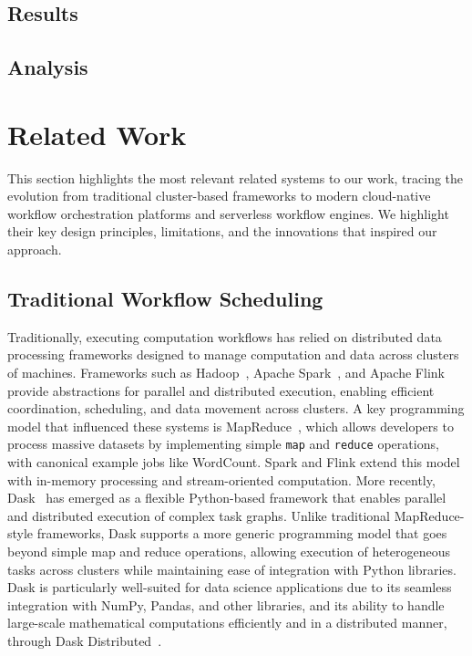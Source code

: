 \documentclass[conference]{IEEEtran}
\begin{document}
\subsection{Results}
\subsection{Analysis}



\section{Related Work}
\label{s:related_work}

This section highlights the most relevant related systems to our work, tracing the evolution from traditional cluster-based frameworks to modern cloud-native workflow orchestration platforms and serverless workflow engines. We highlight their key design principles, limitations, and the innovations that inspired our approach.

\subsection{Traditional Workflow Scheduling}
Traditionally, executing computation workflows has relied on distributed data processing frameworks designed to manage computation and data across clusters of machines. Frameworks such as Hadoop~\cite{apache_hadoop}, Apache Spark~\cite{apache_spark}, and Apache Flink~\cite{apache_flink} provide abstractions for parallel and distributed execution, enabling efficient coordination, scheduling, and data movement across clusters. A key programming model that influenced these systems is MapReduce~\cite{mapreduce}, which allows developers to process massive datasets by implementing simple \texttt{map} and \texttt{reduce} operations, with canonical example jobs like WordCount. Spark and Flink extend this model with in-memory processing and stream-oriented computation. More recently, Dask~\cite{dask_python} has emerged as a flexible Python-based framework that enables parallel and distributed execution of complex task graphs. Unlike traditional MapReduce-style frameworks, Dask supports a more generic programming model that goes beyond simple map and reduce operations, allowing execution of heterogeneous tasks across clusters while maintaining ease of integration with Python libraries. Dask is particularly well-suited for data science applications due to its seamless integration with NumPy, Pandas, and other libraries, and its ability to handle large-scale mathematical computations efficiently and in a distributed manner, through Dask Distributed~\cite{dask_python_distributed}.
\end{document}
